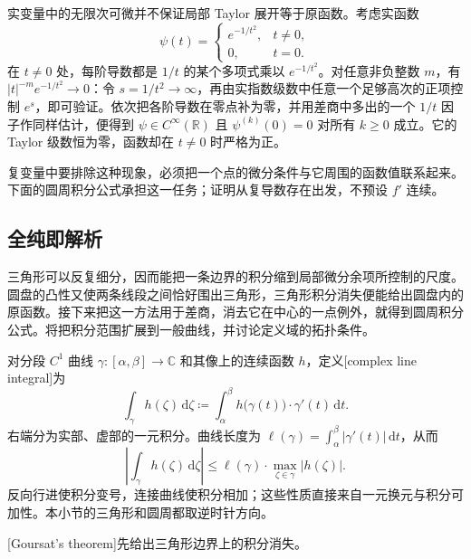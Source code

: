 实变量中的无限次可微并不保证局部 Taylor 展开等于原函数。考虑实函数
\[
 \psi(t)=
 \begin{cases}
 e^{-1/t^2},&t\ne0,\\
 0,&t=0.
 \end{cases}
\]
在 \(t\ne0\) 处，每阶导数都是 \(1/t\) 的某个多项式乘以 \(e^{-1/t^2}\)。对任意非负整数 \(m\)，有 \(|t|^{-m}e^{-1/t^2}\to0\)：令 \(s=1/t^2\to\infty\)，再由实指数级数中任意一个足够高次的正项控制 \(e^s\)，即可验证。依次把各阶导数在零点补为零，并用差商中多出的一个 \(1/t\) 因子作同样估计，便得到 \(\psi\in C^\infty(\mathbb R)\) 且 \(\psi^{(k)}(0)=0\) 对所有 \(k\ge0\) 成立。它的 Taylor 级数恒为零，函数却在 \(t\ne0\) 时严格为正。

\ProseParagraphBreak

复变量中要排除这种现象，必须把一个点的微分条件与它周围的函数值联系起来。下面的圆周积分公式承担这一任务；证明从复导数存在出发，不预设 \(f'\) 连续。

\subsection{全纯即解析}
\label{b3:subsec:010204}

三角形可以反复细分，因而能把一条边界的积分缩到局部微分余项所控制的尺度。圆盘的凸性又使两条线段之间恰好围出三角形，三角形积分消失便能给出圆盘内的原函数。接下来把这一方法用于差商，消去它在中心的一点例外，就得到圆周积分公式。将把积分范围扩展到一般曲线，并讨论定义域的拓扑条件。

\ProseParagraphBreak

对分段 \(C^1\) 曲线 \(\gamma:[\alpha,\beta]\to\mathbb C\) 和其像上的连续函数 \(h\)，定义[complex line integral]为
\[
\int_\gamma h(\zeta)\,\mathrm{d}\zeta
\coloneqq\int_\alpha^\beta h\bigl(\gamma(t)\bigr)\cdot\gamma'(t)\,\mathrm{d}t.
\]
右端分为实部、虚部的一元积分。曲线长度为 \(\ell(\gamma)=\int_\alpha^\beta|\gamma'(t)|\,\mathrm{d}t\)，从而
\begin{equation}\label{b3:eq:01-contour-estimate}
\left|\int_\gamma h(\zeta)\,\mathrm{d}\zeta\right|
\leq\ell(\gamma)\cdot\max_{\zeta\in\gamma}|h(\zeta)|.
\end{equation}
反向行进使积分变号，连接曲线使积分相加；这些性质直接来自一元换元与积分可加性。本小节的三角形和圆周都取逆时针方向。

\ProseParagraphBreak

[Goursat's theorem]先给出三角形边界上的积分消失。


